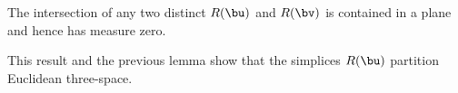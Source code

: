 
\begin{lemma}  
The intersection of any two distinct $R(\bu)$ and $R(\bv)$ is
contained in a plane and hence has measure zero.
\end{lemma}

This result and the previous lemma show that the simplices $R(\bu)$
partition Euclidean three-space.

